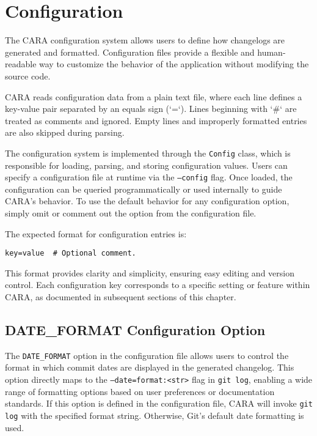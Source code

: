 \chapter{Configuration}
\label{ch:configuration}
\pagestyle{fancy}

The CARA configuration system allows users to define how changelogs are generated and formatted. Configuration files provide a flexible and human-readable way to customize the behavior of the application without modifying the source code.

CARA reads configuration data from a plain text file, where each line defines a key-value pair separated by an equals sign (`=`). Lines beginning with `\#` are treated as comments and ignored. Empty lines and improperly formatted entries are also skipped during parsing.

The configuration system is implemented through the \texttt{Config} class, which is responsible for loading, parsing, and storing configuration values. Users can specify a configuration file at runtime via the \texttt{--config} flag. Once loaded, the configuration can be queried programmatically or used internally to guide CARA’s behavior. To use the default behavior for any configuration option, simply omit or comment out the option from the configuration file.

The expected format for configuration entries is:

\begin{lstlisting}[style=cppstyle]
key=value  # Optional comment.
\end{lstlisting}

This format provides clarity and simplicity, ensuring easy editing and version control. Each configuration key corresponds to a specific setting or feature within CARA, as documented in subsequent sections of this chapter.















\section{DATE\_FORMAT Configuration Option}

The \texttt{DATE\_FORMAT} option in the configuration file allows users to control the format in which commit dates are displayed in the generated changelog. This option directly maps to the \texttt{--date=format:<str>} flag in \texttt{git log}, enabling a wide range of formatting options based on user preferences or documentation standards. If this option is defined in the configuration file, CARA will invoke \texttt{git log} with the specified format string. Otherwise, Git's default date formatting is used.

